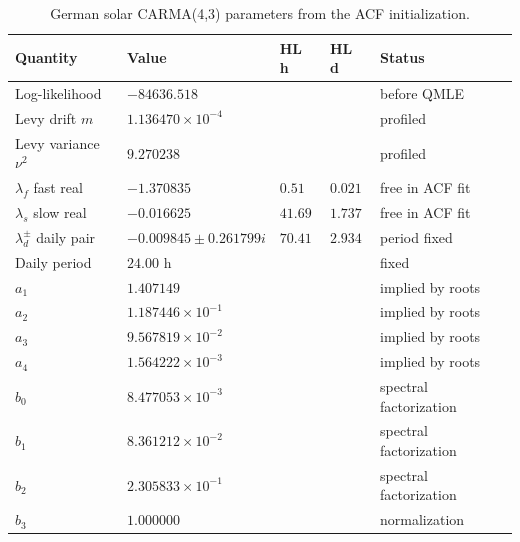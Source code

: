 \begin{table}[!htbp]
  \centering
  \caption{German solar CARMA(4,3) parameters from the ACF initialization.}
  \label{tab:solar-carma-acf-init}
  \begin{tabular}{@{}lllll@{}}
    \toprule
    Quantity & Value & HL h & HL d & Status \\
    \midrule
    Log-likelihood & \(-84636.518\) & & & before QMLE \\
    Levy drift \(m\) & \(1.136470{\times}10^{-4}\) & & & profiled \\
    Levy variance \(\nu^2\) & \(9.270238\) & & & profiled \\
    \midrule
    \(\lambda_f\) fast real & \(-1.370835\) & \(0.51\) & \(0.021\) & free in ACF fit \\
    \(\lambda_s\) slow real & \(-0.016625\) & \(41.69\) & \(1.737\) & free in ACF fit \\
    \(\lambda_d^\pm\) daily pair & \(-0.009845\pm0.261799i\) & \(70.41\) & \(2.934\) & period fixed \\
    Daily period & \(24.00\) h & & & fixed \\
    \midrule
    \(a_1\) & \(1.407149\) & & & implied by roots \\
    \(a_2\) & \(1.187446{\times}10^{-1}\) & & & implied by roots \\
    \(a_3\) & \(9.567819{\times}10^{-2}\) & & & implied by roots \\
    \(a_4\) & \(1.564222{\times}10^{-3}\) & & & implied by roots \\
    \midrule
    \(b_0\) & \(8.477053{\times}10^{-3}\) & & & spectral factorization \\
    \(b_1\) & \(8.361212{\times}10^{-2}\) & & & spectral factorization \\
    \(b_2\) & \(2.305833{\times}10^{-1}\) & & & spectral factorization \\
    \(b_3\) & \(1.000000\) & & & normalization \\
    \bottomrule
  \end{tabular}
\end{table}

